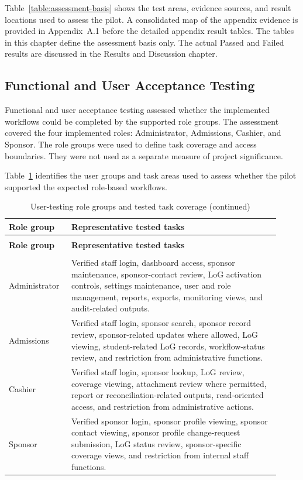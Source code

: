 Table~\ref{table:assessment-basis} shows the test areas, evidence sources, and result locations used to assess the pilot. A consolidated map of the appendix evidence is provided in Appendix~A.1 before the detailed appendix result tables. The tables in this chapter define the assessment basis only. The actual Passed and Failed results are discussed in the Results and Discussion chapter.

\subsection{Functional and User Acceptance Testing}

Functional and user acceptance testing assessed whether the implemented workflows could be completed by the supported role groups. The assessment covered the four implemented roles: Administrator, Admissions, Cashier, and Sponsor. The role groups were used to define task coverage and access boundaries. They were not used as a separate measure of project significance.

\setlength{\LTleft}{0pt}
\setlength{\LTright}{\fill}
Table~\ref{table:user-testing-role-groups-task-coverage} identifies the user groups and task areas used to assess whether the pilot supported the expected role-based workflows.

\begin{longtable}{>{\raggedright\arraybackslash}p{0.20\linewidth}
>{\raggedright\arraybackslash}p{0.72\linewidth}}
\caption{User-testing role groups and tested task coverage}\label{table:user-testing-role-groups-task-coverage}\\
\toprule
\textbf{Role group} & \textbf{Representative tested tasks} \\
\midrule
\endfirsthead
\caption[]{User-testing role groups and tested task coverage (continued)}\\
\toprule
\textbf{Role group} & \textbf{Representative tested tasks} \\
\midrule
\endhead
\midrule
\multicolumn{2}{r}{\textit{Continued on next page}}\\
\endfoot
\bottomrule
\endlastfoot
Administrator & Verified staff login, dashboard access, sponsor maintenance, sponsor-contact review, LoG activation controls, settings maintenance, user and role management, reports, exports, monitoring views, and audit-related outputs. \\
Admissions & Verified staff login, sponsor search, sponsor record review, sponsor-related updates where allowed, LoG viewing, student-related LoG records, workflow-status review, and restriction from administrative functions. \\
Cashier & Verified staff login, sponsor lookup, LoG review, coverage viewing, attachment review where permitted, report or reconciliation-related outputs, read-oriented access, and restriction from administrative actions. \\
Sponsor & Verified sponsor login, sponsor profile viewing, sponsor contact viewing, sponsor profile change-request submission, LoG status review, sponsor-specific coverage views, and restriction from internal staff functions. \\
\end{longtable}

